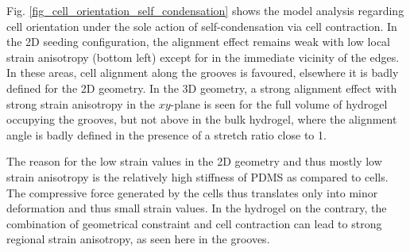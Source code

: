 \documentclass[11pt]{amsart}
\begin{document}
\begin{figure}
\end{figure}


Fig. \ref{fig_cell_orientation_self_condensation} shows the model analysis regarding cell orientation under the sole action of self-condensation via cell contraction. In the 2D seeding configuration, the alignment effect remains weak with low local strain anisotropy (bottom left) except for in the immediate vicinity of the edges. In these areas, cell alignment along the grooves is favoured, elsewhere it is badly defined for the 2D geometry. In the 3D geometry, a strong alignment effect with strong strain anisotropy in the $xy$-plane is seen for the full volume of hydrogel occupying the grooves, but not above in the bulk hydrogel, where the alignment angle is badly defined in the presence of a stretch ratio close to 1.

The reason for the low strain values in the 2D geometry and thus mostly low strain anisotropy is the relatively high stiffness of PDMS as compared to cells. The compressive force generated by the cells thus translates only into minor deformation and thus small strain values. In the hydrogel on the contrary, the combination of geometrical constraint and cell contraction can lead to strong regional strain anisotropy, as seen here in the grooves.
\end{document}

